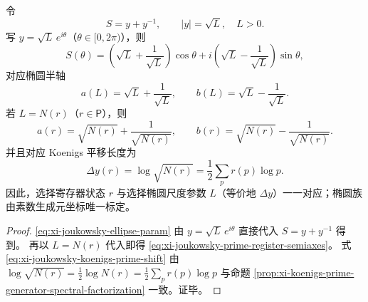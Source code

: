 \begin{corollary}\label{cor:xi-joukowsky-prime-register-ellipse-parameterization}
令
\[
S=y+y^{-1},\qquad
|y|=\sqrt L,\quad L>0.
\]
写 \(y=\sqrt L\,e^{i\theta}\)（\(\theta\in[0,2\pi)\)），则
\begin{equation}\label{eq:xi-joukowsky-ellipse-param}
S(\theta)
=
\left(\sqrt L+\frac{1}{\sqrt L}\right)\cos\theta
+i\left(\sqrt L-\frac{1}{\sqrt L}\right)\sin\theta,
\end{equation}
对应椭圆半轴
\[
a(L)=\sqrt L+\frac{1}{\sqrt L},
\qquad
b(L)=\sqrt L-\frac{1}{\sqrt L}.
\]
若 \(L=N(r)\)（\(r\in\mathsf P\)），则
\begin{equation}\label{eq:xi-joukowsky-prime-register-semiaxes}
a(r)=\sqrt{N(r)}+\frac{1}{\sqrt{N(r)}},
\qquad
b(r)=\sqrt{N(r)}-\frac{1}{\sqrt{N(r)}}.
\end{equation}
并且对应 Koenigs 平移长度为
\begin{equation}\label{eq:xi-joukowsky-koenigs-prime-shift}
\Delta y(r)=\log\sqrt{N(r)}
=\frac12\sum_{p}r(p)\log p.
\end{equation}
因此，选择寄存器状态 \(r\) 与选择椭圆尺度参数 \(L\)（等价地 \(\Delta y\)）一一对应；椭圆族由素数生成元坐标唯一标定。
\end{corollary}
\begin{proof}
\eqref{eq:xi-joukowsky-ellipse-param}
由 \(y=\sqrt L\,e^{i\theta}\) 直接代入 \(S=y+y^{-1}\) 得到。
再以 \(L=N(r)\) 代入即得
\eqref{eq:xi-joukowsky-prime-register-semiaxes}。
式
\eqref{eq:xi-joukowsky-koenigs-prime-shift}
由
\(
\log\sqrt{N(r)}=\frac12\log N(r)=\frac12\sum_p r(p)\log p
\)
与命题 \ref{prop:xi-koenigs-prime-generator-spectral-factorization}
一致。证毕。
\end{proof}

\endinput
